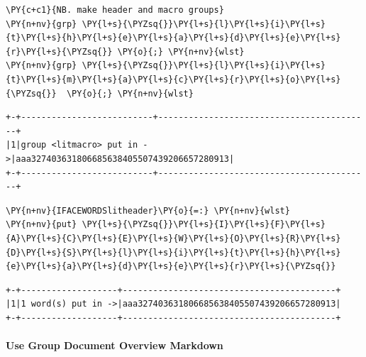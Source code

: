     \begin{tcolorbox}[breakable, size=fbox, boxrule=1pt, pad at break*=1mm,colback=cellbackground, colframe=cellborder]
\begin{Verbatim}[commandchars=\\\{\}]
\PY{c+c1}{NB. make header and macro groups}
\PY{n+nv}{grp} \PY{l+s}{\PYZsq{}}\PY{l+s}{l}\PY{l+s}{i}\PY{l+s}{t}\PY{l+s}{h}\PY{l+s}{e}\PY{l+s}{a}\PY{l+s}{d}\PY{l+s}{e}\PY{l+s}{r}\PY{l+s}{\PYZsq{}} \PY{o}{;} \PY{n+nv}{wlst}
\PY{n+nv}{grp} \PY{l+s}{\PYZsq{}}\PY{l+s}{l}\PY{l+s}{i}\PY{l+s}{t}\PY{l+s}{m}\PY{l+s}{a}\PY{l+s}{c}\PY{l+s}{r}\PY{l+s}{o}\PY{l+s}{\PYZsq{}}  \PY{o}{;} \PY{n+nv}{wlst}
\end{Verbatim}
\end{tcolorbox}

    \begin{Verbatim}[commandchars=\\\{\}]
+-+--------------------------+------------------------------------------+
|1|group <litmacro> put in ->|aaa327403631806685638405507439206657280913|
+-+--------------------------+------------------------------------------+
    \end{Verbatim}

    \begin{tcolorbox}[breakable, size=fbox, boxrule=1pt, pad at break*=1mm,colback=cellbackground, colframe=cellborder]
\begin{Verbatim}[commandchars=\\\{\}]
\PY{n+nv}{IFACEWORDSlitheader}\PY{o}{=:} \PY{n+nv}{wlst}
\PY{n+nv}{put} \PY{l+s}{\PYZsq{}}\PY{l+s}{I}\PY{l+s}{F}\PY{l+s}{A}\PY{l+s}{C}\PY{l+s}{E}\PY{l+s}{W}\PY{l+s}{O}\PY{l+s}{R}\PY{l+s}{D}\PY{l+s}{S}\PY{l+s}{l}\PY{l+s}{i}\PY{l+s}{t}\PY{l+s}{h}\PY{l+s}{e}\PY{l+s}{a}\PY{l+s}{d}\PY{l+s}{e}\PY{l+s}{r}\PY{l+s}{\PYZsq{}}
\end{Verbatim}
\end{tcolorbox}

    \begin{Verbatim}[commandchars=\\\{\}]
+-+-------------------+------------------------------------------+
|1|1 word(s) put in ->|aaa327403631806685638405507439206657280913|
+-+-------------------+------------------------------------------+
    \end{Verbatim}

    \hypertarget{use-group-document-overview-markdown}{%
\paragraph{Use Group Document Overview
Markdown}\label{use-group-document-overview-markdown}}

